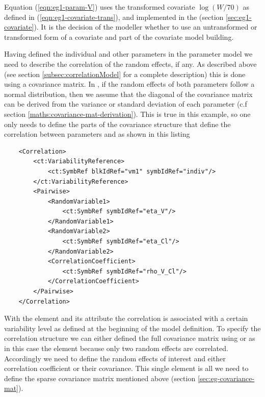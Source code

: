 Equation (\ref{eqn:eg1-param-V}) uses the transformed covariate 
$\log\left(W/70\right)$ as defined in (\ref{eqn:eg1-covariate-trans}), 
and implemented in the  (section \ref{sec:eg1-covariate}).
It is the decision of the modeller whether to use an untransformed or 
transformed form of a covariate and part of the covariate model building. 

Having defined the individual and other parameters in the parameter
model we need to describe the correlation of the random effects, if any.
As described above (see section \ref{subsec:correlationModel} for
a complete description) this is done using a covariance matrix.
In \pharmml, if the random effects of both
parameters follow a normal distribution, then we assume that the
diagonal of the covariance matrix can be derived from the variance or
standard deviation of each parameter (c.f section
\ref{maths:covariance-mat-derivation}). This is true in this example,
so one only needs to define the parts of the covariance structure that
define the correlation between parameters  and 
as shown in this listing 
\lstset{language=XML}
\begin{lstlisting}
    <Correlation>
        <ct:VariabilityReference>
            <ct:SymbRef blkIdRef="vm1" symbIdRef="indiv"/>
        </ct:VariabilityReference>
        <Pairwise>
            <RandomVariable1>
                <ct:SymbRef symbIdRef="eta_V"/>
            </RandomVariable1>
            <RandomVariable2>
                <ct:SymbRef symbIdRef="eta_Cl"/>
            </RandomVariable2>
            <CorrelationCoefficient>
                <ct:SymbRef symbIdRef="rho_V_Cl"/>
            </CorrelationCoefficient>
        </Pairwise>
    </Correlation>
\end{lstlisting}

With the  element and its  
attribute the correlation is associated with a certain variability level 
as defined at the beginning of the model definition. 
To specify the correlation structure we can either defined the full covariance
matrix using  or as in this case the  element
because only two random effects are correlated. Accordingly we need to 
define the random effects of interest and either correlation coefficient or
their covariance.
This single  element is all we need to define the sparse 
covariance matrix mentioned above (section \ref{sec:eg-covariance-mat}). 


